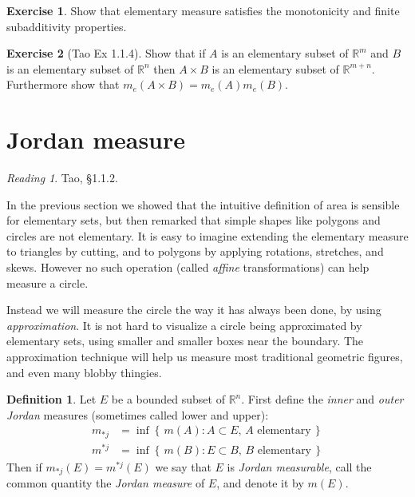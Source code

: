 \documentclass[11pt,oneside]{amsbook}
\newcommand{\set}[1]{\left\{\,#1\,\right\}}
\newcommand{\RR}{{\mathbb R}}
\theoremstyle{definition}
\newtheorem{exerc}{Exercise}[section]
\theoremstyle{plain}
\theoremstyle{definition}
\newtheorem{defn}[thm]{Definition}
\theoremstyle{remark}
\newtheorem*{reading}{Reading}
\numberwithin{equation}{section}
\numberwithin{figure}{section}
\begin{document}
\begin{exerc}
 Show that elementary measure satisfies the monotonicity and finite subadditivity properties. 
\end{exerc}

\begin{exerc}[Tao Ex 1.1.4]
  Show that if $A$ is an elementary subset of $\RR^m$ and $B$ is an elementary subset of $\RR^n$ then $A\times B$ is an elementary subset of $\RR^{m+n}$. Furthermore show that $m_e(A\times B)=m_e(A)m_e(B)$.
\end{exerc}

\newpage
\section{Jordan measure}

\begin{reading}
  Tao, \S1.1.2.
\end{reading}

In the previous section we showed that the intuitive definition of area is sensible for elementary sets, but then remarked that simple shapes like polygons and circles are not elementary. It is easy to imagine extending the elementary measure to triangles by cutting, and to polygons by applying rotations, stretches, and skews. However no such operation (called \emph{affine} transformations) can help measure a circle.

Instead we will measure the circle the way it has always been done, by using \emph{approximation}. It is not hard to visualize a circle being approximated by elementary sets, using smaller and smaller boxes near the boundary. The approximation technique will help us measure most traditional geometric figures, and even many blobby thingies.

\begin{defn}
  Let $E$ be a bounded subset of $\RR^n$. First define the \emph{inner} and \emph{outer Jordan} measures (sometimes called lower and upper):
  \begin{align*}
    m_{*j}&=\inf\set{m(A):A\subset E,\, A\text{ elementary}}\\
    m^{*j}&=\inf\set{m(B):E\subset B,\, B\text{ elementary}}
  \end{align*}
  Then if $m_{*j}(E)=m^{*j}(E)$ we say that $E$ is \emph{Jordan measurable}, call the common quantity the \emph{Jordan measure} of $E$, and denote it by $m(E)$.
\end{defn}
\end{document}
